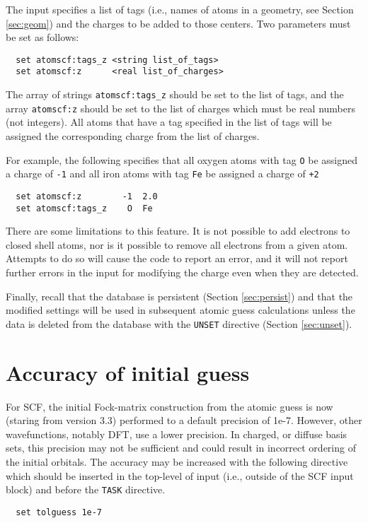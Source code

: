 The input specifies a list of tags (i.e., names of atoms in a
geometry, see Section \ref{sec:geom}) and the charges to be added to
those centers.  Two parameters must be set as follows:
\begin{verbatim}
  set atomscf:tags_z <string list_of_tags>
  set atomscf:z      <real list_of_charges>
\end{verbatim}

\sloppy

The array of strings \verb+atomscf:tags_z+ should be set to the list
of tags, and the array \verb+atomscf:z+ should be set to the list of
charges which must be real numbers (not integers).  All atoms that
have a tag specified in the list of tags will be assigned the
corresponding charge from the list of charges.

\fussy

For example, the following specifies that all oxygen atoms with tag
\verb+O+ be assigned a charge of \verb+-1+ and all iron atoms with tag
\verb+Fe+ be assigned a charge of \verb=+2=
\begin{verbatim}
  set atomscf:z        -1  2.0
  set atomscf:tags_z    O  Fe
\end{verbatim}

There are some limitations to this feature.  It is not possible to add
electrons to closed shell atoms, nor is it possible to remove all
electrons from a given atom.  Attempts to do so will cause the code to
report an error, and it will not report further errors in the input
for modifying the charge even when they are detected.

Finally, recall that the database is persistent (Section
\ref{sec:persist}) and that the modified settings will be used in
subsequent atomic guess calculations unless the data is deleted from
the database with the \verb+UNSET+ directive (Section
\ref{sec:unset}).

\section{Accuracy of initial guess}
\label{sec:tolguess}

For SCF, the initial Fock-matrix construction from the atomic guess is
now (staring from version 3.3) performed to a default precision of
1e-7.  However, other wavefunctions, notably DFT, use a lower
precision.  In charged, or diffuse basis sets, this precision may not
be sufficient and could result in incorrect ordering of the initial
orbitals.  The accuracy may be increased with the following directive
which should be inserted in the top-level of input (i.e., outside of
the SCF input block) and before the {\tt TASK} directive.
\begin{verbatim}
  set tolguess 1e-7
\end{verbatim}

